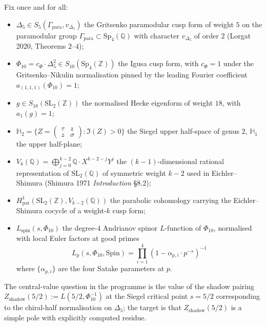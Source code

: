 Fix once and for all:
\begin{itemize}
\item $\Delta_5 \in S_5(\Gamma_{\mathrm{para}}, v_{\Delta_5})$ the
      Gritsenko paramodular cusp form of weight $5$ on the paramodular
      group $\Gamma_{\mathrm{para}} \subset \mathrm{Sp}_4(\mathbb{Q})$
      with character $v_{\Delta_5}$ of order $2$ (Lorgat 2020, Theorems
      $2$--$4$);
\item $\Phi_{10} = c_\Phi \cdot \Delta_5^2 \in S_{10}(\mathrm{Sp}_4(\mathbb{Z}))$
      the Igusa cusp form, with $c_\Phi = 1$ under the
      Gritsenko--Nikulin normalisation pinned by the leading Fourier
      coefficient $a_{(1,1,1)}(\Phi_{10}) = 1$;
\item $g \in S_{18}(\mathrm{SL}_2(\mathbb{Z}))$ the normalised Hecke
      eigenform of weight $18$, with $a_1(g) = 1$;
\item $\mathbb{H}_2 = \{Z = \left(\begin{smallmatrix}\tau & z \\ z & \sigma \end{smallmatrix}\right) :
      \Im(Z) > 0\}$ the Siegel upper half-space of genus $2$,
      $\mathbb{H}_1$ the upper half-plane;
\item $V_k(\mathbb{Q}) = \bigoplus_{j = 0}^{k - 2}
      \mathbb{Q} \cdot X^{k - 2 - j} Y^j$ the $(k - 1)$-dimensional
      rational representation of $\mathrm{SL}_2(\mathbb{Q})$ of symmetric
      weight $k - 2$ used in Eichler--Shimura (Shimura 1971
      \emph{Introduction} \S$8.2$);
\item $H^1_{\mathrm{par}}(\mathrm{SL}_2(\mathbb{Z}), V_{k - 2}(\mathbb{Q}))$
      the parabolic cohomology carrying the Eichler--Shimura cocycle
      of a weight-$k$ cusp form;
\item $L_{\mathrm{spin}}(s, \Phi_{10})$ the degree-$4$ Andrianov spinor
      $L$-function of $\Phi_{10}$, normalised with local Euler factors
      at good primes
      \[
       L_p(s, \Phi_{10}, \mathrm{Spin}) = \prod_{i = 1}^{4}
       (1 - \alpha_{p, i} \cdot p^{-s})^{-1}
      \]
      where $\{\alpha_{p, i}\}$ are the four Satake parameters at $p$.
\end{itemize}

The central-value question in the programme is the value of the
shadow pairing $Z_{\mathrm{shadow}}(5/2) := L(5/2, \Phi_{10}^{-1})$
at the Siegel critical point $s = 5/2$ corresponding to the
chiral-half normalisation on $\Delta_5$; the target is that
$Z_{\mathrm{shadow}}(5/2)$ is a simple pole with explicitly computed
residue.

